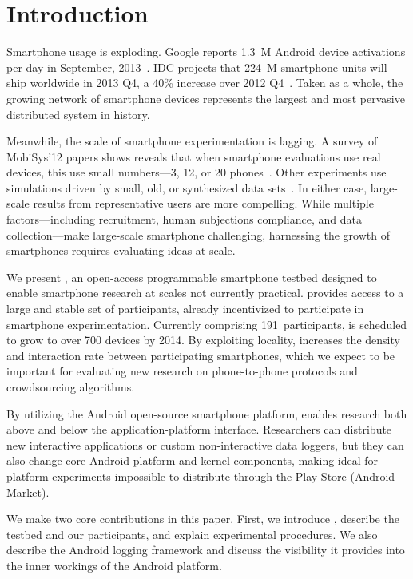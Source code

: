 \section{Introduction}
\label{sec-introduction}

Smartphone usage is exploding. Google reports 1.3~M Android device activations
per day in September, 2013~\cite{google-Sep2012-activations}. IDC projects that
224~M smartphone units will ship worldwide in 2013 Q4, a 40\% increase over
2012 Q4~\cite{idc-smartphone-growth}. Taken as a whole, the growing network of
smartphone devices represents the largest and most pervasive distributed system
in history.

Meanwhile, the scale of smartphone experimentation is lagging. A survey of
MobiSys'12 papers shows reveals that when smartphone evaluations use real
devices, this use small numbers---3, 12, or 20
phones~\cite{nowar-mobisys12,comon-mobisys12,caching-mobisys12}. Other
experiments use simulations driven by small, old, or synthesized data
sets~\cite{falcon-mobisys12,ace-mobisys12,humanmobility-mobisys12}. In either
case, large-scale results from representative users are more compelling.
While multiple factors---including recruitment, human subjections compliance,
and data collection---make large-scale smartphone challenging, harnessing the
growth of smartphones requires evaluating ideas at scale.

We present \PhoneLab{}, an open-access programmable smartphone testbed
designed to enable smartphone research at scales not currently practical.
\PhoneLab{} provides access to a large and stable set of participants,
already incentivized to participate in smartphone experimentation. Currently
comprising 191~participants, \PhoneLab{} is scheduled to grow to over 700
devices by 2014. By exploiting locality, \PhoneLab{} increases the density
and interaction rate between participating smartphones, which we expect to be
important for evaluating new research on phone-to-phone protocols and
crowdsourcing algorithms.

By utilizing the Android open-source smartphone platform, \PhoneLab{} enables
research both above and below the application-platform interface. Researchers
can distribute new interactive applications or custom non-interactive data
loggers, but they can also change core Android platform and kernel
components, making \PhoneLab{} ideal for platform experiments impossible to
distribute through the Play Store (Android Market).

We make two core contributions in this paper. First, we introduce
\PhoneLab{}, describe the testbed and our participants, and explain
experimental procedures. We also describe the Android logging framework and
discuss the visibility it provides into the inner workings of the Android
platform.

